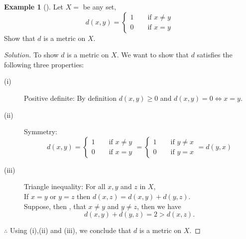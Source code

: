 \documentclass[	DIV=calc,paper=a4,fontsize=11pt]{scrartcl}	 	%
\theoremstyle{definition}
\newtheorem{exmp}[thm]{Example}
\theoremstyle{plain}
\theoremstyle{remark}
\begin{document}
\begin{exmp}[]
Let $X=$ be any set,
\[d(x,y)=
\begin{cases}
1 \qquad \text{if } x\neq y\\
0\qquad \text{if } x=y
\end{cases}
\]
Show that $d$ is a metric on $X$.
\end{exmp}
\begin{proof}[Solution]
To show $d$ is a metric on $X$. We want to show that $d$ satisfies the following three properties:
\begin{description}
  \item[(i)] Positive definite:
By definition $d(x,y)\ge 0$ and $d(x,y)=0\Leftrightarrow x=y$.
  \item[(ii)] Symmetry:
\[d(x,y)=
\begin{cases}
1 \qquad \text{if } x\neq y\\
0\qquad \text{if } x=y
\end{cases}
=\begin{cases}
1 \qquad \text{if } y\neq x\\
0\qquad \text{if } y=x
\end{cases}
=d(y,x)\]
  \item[(iii)] Triangle inequality: For all $x,y$ and $z$ in $X$,\\
If $x = y$ or $y = z$ then $d(x, z) = d(x, y) + d(y,z)$.\\
\noindent Suppose, then , that $x\neq y$ and $y\neq z$, then we have
\[d(x,y)+d(y, z)=2 > d(x,z).\]
\end{description}
$\therefore$ Using (i),(ii) and (iii), we conclude that $d$ is a metric on $X$.
\end{proof}
\end{document}
